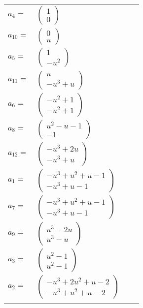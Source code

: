 \documentclass[1p]{elsarticle_modified}
\theoremstyle{definition}
\begin{document}
\begin{tabular}{m{7pt} m{180pt} m{7pt} m{180pt} }
\flushright $a_{4}=$&$\begin{pmatrix}1\\0\end{pmatrix}$ \\
\flushright $a_{10}=$&$\begin{pmatrix}0\\u\end{pmatrix}$ \\
\flushright $a_{5}=$&$\begin{pmatrix}1\\- u^2\end{pmatrix}$ \\
\flushright $a_{11}=$&$\begin{pmatrix}u\\- u^3+u\end{pmatrix}$ \\
\flushright $a_{6}=$&$\begin{pmatrix}- u^2+1\\- u^2+1\end{pmatrix}$ \\
\flushright $a_{8}=$&$\begin{pmatrix}u^2- u-1\\-1\end{pmatrix}$ \\
\flushright $a_{12}=$&$\begin{pmatrix}- u^3+2 u\\- u^3+u\end{pmatrix}$ \\
\flushright $a_{1}=$&$\begin{pmatrix}- u^3+u^2+u-1\\- u^3+u-1\end{pmatrix}$ \\
\flushright $a_{7}=$&$\begin{pmatrix}- u^3+u^2+u-1\\- u^3+u-1\end{pmatrix}$ \\
\flushright $a_{9}=$&$\begin{pmatrix}u^3-2 u\\u^3- u\end{pmatrix}$ \\
\flushright $a_{3}=$&$\begin{pmatrix}u^2-1\\u^2-1\end{pmatrix}$ \\
\flushright $a_{2}=$&$\begin{pmatrix}- u^3+2 u^2+u-2\\- u^3+u^2+u-2\end{pmatrix}$\\&\end{tabular}
\end{document}
